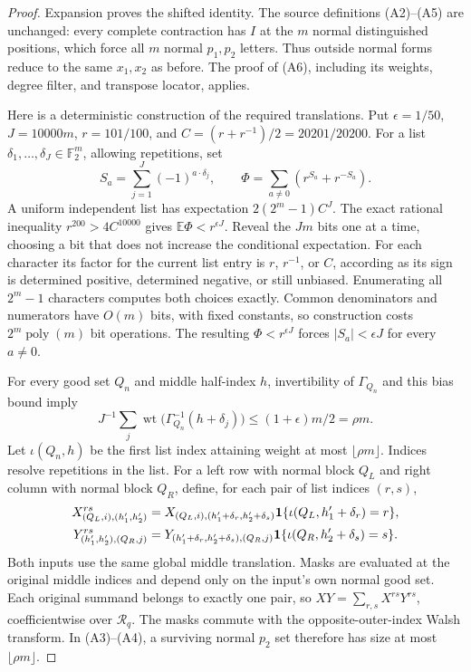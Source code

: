 \documentclass[11pt]{article}
\begin{document}
\begin{proof}
Expansion proves the shifted identity. The source definitions
(A2)--(A5) are unchanged: every complete contraction has $I$ at the
$m$ normal distinguished positions, which force all $m$ normal
$p_1,p_2$ letters. Thus outside normal forms reduce to the same
$x_1,x_2$ as before. The proof of (A6), including its weights,
degree filter, and transpose locator, applies.

Here is a deterministic construction of the required translations.
Put $\epsilon=1/50$, $J=10000m$, $r=101/100$, and
$C=(r+r^{-1})/2=20201/20200$. For a list
$\delta_1,\ldots,\delta_J\in\mathbb F_2^m$, allowing repetitions, set
\[
 S_a=\sum_{j=1}^J(-1)^{a\cdot\delta_j},\qquad
 \Phi=\sum_{a\ne0}(r^{S_a}+r^{-S_a}).
\]
A uniform independent list has expectation $2(2^m-1)C^J$.
The exact rational inequality $r^{200}>4C^{10000}$ gives
$\mathbb E\Phi<r^{\epsilon J}$. Reveal the $Jm$ bits one at a time,
choosing a bit that does not increase the conditional expectation.
For each character its factor for the current list entry is $r$,
$r^{-1}$, or $C$, according as its sign is determined positive,
determined negative, or still unbiased. Enumerating all $2^m-1$
characters computes both choices exactly. Common denominators and
numerators have $O(m)$ bits, with fixed constants, so construction
costs $2^m\operatorname{poly}(m)$ bit operations. The resulting
$\Phi<r^{\epsilon J}$ forces $|S_a|<\epsilon J$ for every $a\ne0$.

For every good set $Q_n$ and middle half-index $h$, invertibility of
$\Gamma_{Q_n}$ and this bias bound imply
\[
 J^{-1}\sum_j
 \operatorname{wt}\bigl(\Gamma_{Q_n}^{-1}(h+\delta_j)\bigr)
 \le (1+\epsilon)m/2=\rho m.
\]
Let $\iota(Q_n,h)$ be the first list index attaining weight at most
$\lfloor\rho m\rfloor$. Indices resolve repetitions in the list.
For a left row with normal block $Q_L$ and right column with
normal block $Q_R$, define, for each pair of list indices $(r,s)$,
\[
\begin{aligned}
 X^{rs}_{(Q_L,i),(h'_1,h'_2)}
 &=X_{(Q_L,i),(h'_1+\delta_r,h'_2+\delta_s)}
   {\bf1}\{\iota(Q_L,h'_1+\delta_r)=r\},\\
 Y^{rs}_{(h'_1,h'_2),(Q_R,j)}
 &=Y_{(h'_1+\delta_r,h'_2+\delta_s),(Q_R,j)}
   {\bf1}\{\iota(Q_R,h'_2+\delta_s)=s\}.
\end{aligned}
\]
Both inputs use the same global middle translation. Masks are evaluated
at the original middle indices and depend only on the input's own
normal good set. Each original summand belongs to exactly one pair,
so $XY=\sum_{r,s}X^{rs}Y^{rs}$, coefficientwise over $\mathcal R_q$.
The masks commute with the opposite-outer-index Walsh transform.
In (A3)--(A4), a surviving normal $p_2$ set therefore has size at most
$\lfloor\rho m\rfloor$.


\end{proof}
\end{document}
